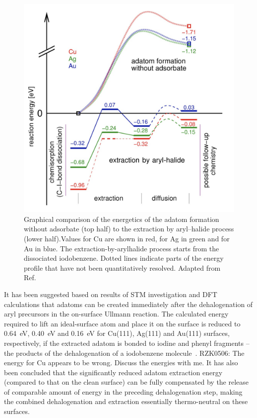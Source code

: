 \documentclass[%
 reprint,
 amsmath,amssymb,
 aps,
prb,
floatfix,
]{revtex4-2}
\newcommand{\lock}{\color{red}}
\newcommand{\lock}{\color{red}}
\newcommand{\comm}{\color{Purple}} %
\begin{document}
\begin{figure}[htb]
\centering
\includegraphics[width=0.75\columnwidth]{Fig/Adatom-formation.png}
\caption{Graphical comparison of the energetics of the adatom formation without adsorbate (top half) to the extraction by aryl–halide process (lower half).Values for Cu are shown in red, for Ag in green and for Au in blue. The extraction-by-arylhalide process starts from the dissociated iodobenzene. Dotted lines indicate parts of the energy profile that have not been quantitatively resolved. Adapted from Ref.~\cite{chemeurope2017}}
\label{fig:3}
\end{figure}

\fi

{\lock

It has been suggested based on results of STM investigation and DFT calculations that adatoms can be created immediately after the dehalogenation of aryl precursors in the on-surface Ullmann reaction. 
The calculated energy required to lift an ideal-surface atom and place it on the surface is reduced to \SI{0.64}{\electronvolt}, \SI{0.40}{\electronvolt} and \SI{0.16}{\electronvolt} for Cu(111), Ag(111) and Au(111) surfaces, respectively, if the extracted adatom is bonded to iodine and phenyl fragments -- the products of the dehalogenation of a iodobenzene molecule~\cite{chemeurope2017}. {\comm RZK0506: The energy for Cu appears to be wrong. Discuss the energies with me.}
%
It has also been concluded that the significantly reduced adatom extraction energy (compared to that on the clean surface) can be fully compensated by the release of comparable amount of energy in the preceding dehalogenation step, making the combined dehalogenation and extraction essentially thermo-neutral on these surfaces.


}
\end{document}
